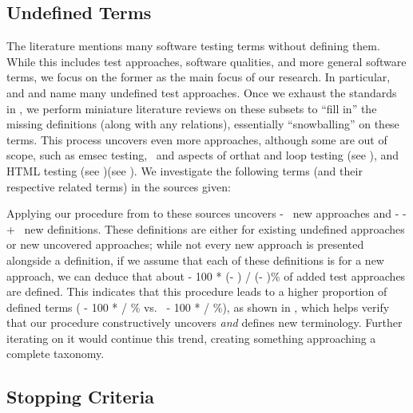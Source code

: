 \subsection{Undefined Terms}\label{undef-terms}

The literature mentions many software testing terms without defining them.
While this includes test approaches, software qualities, and more general
software terms, we focus on the former as the main focus of our research.
In particular, \ifnotpaper \citet{IEEE2022} and \citet{Firesmith2015} \else
    \cite{Firesmith2015} and \cite{IEEE2022} \fi name many undefined test
approaches. Once we exhaust the standards in , we
perform miniature literature reviews on these subsets to ``fill in'' the
missing definitions (along with any relations), essentially ``snowballing''
on these terms. This process uncovers even more approaches, although some are
out of scope, such as \acf{emsec} testing\ifnotpaper, \else\ and \fi
aspects of \acf{orthat} \ifnotpaper and loop testing (see ),
    and HTML testing (see )\else (see )\fi.
We investigate the following terms (and their respective related terms) in the
sources given:


\label{iter-undef}
Applying our procedure from  to these sources uncovers
\the\numexpr \TotalAfter - \TotalBefore\relax\ new approaches and
\the\numexpr \TotalAfter - \UndefAfter - \TotalBefore + \UndefBefore\relax\ new
definitions. These definitions are either for existing undefined approaches or
new uncovered approaches; while not every new approach is presented alongside
a definition, if we assume that each of these definitions is for a new approach,
we can deduce that about \the{} - 100 * (\UndefAfter - \UndefBefore) /
(\TotalAfter - \TotalBefore)\relax\% of added test approaches are defined. This
indicates that this procedure leads to a higher proportion of defined terms
(\the{} - 100 * \UndefBefore / \TotalBefore\relax\% vs.~%
\the{} - 100 * \UndefAfter / \TotalAfter\relax\%), as shown in
, which helps verify that our procedure constructively
uncovers \emph{and} defines new terminology. Further iterating on it would
continue this trend, creating something approaching a complete taxonomy.

\ifnotpaper
    
\fi

\subsection{Stopping Criteria}\label{stop-crit}

